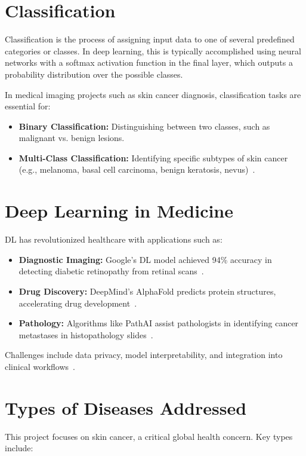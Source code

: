 \documentclass[a4paper,12pt]{report}
\begin{document}
\begin{spacing}{1.5}
    \section{Classification}
    Classification is the process of assigning input data to one of several predefined categories or classes. In deep learning, this is typically accomplished using neural networks with a softmax activation function in the final layer, which outputs a probability distribution over the possible classes.

    In medical imaging projects such as skin cancer diagnosis, classification tasks are essential for:
    \begin{itemize}
        \item \textbf{Binary Classification:} Distinguishing between two classes, such as malignant vs. benign lesions.
        \item \textbf{Multi-Class Classification:} Identifying specific subtypes of skin cancer (e.g., melanoma, basal cell carcinoma, benign keratosis, nevus)~\cite{dl6}.
    \end{itemize}

    \section{Deep Learning in Medicine}
    DL has revolutionized healthcare with applications such as:

    \begin{itemize}
        \item \textbf{Diagnostic Imaging:} Google’s DL model achieved 94\% accuracy in detecting diabetic retinopathy from retinal scans~\cite{dl8}.
        \item \textbf{Drug Discovery:} DeepMind’s AlphaFold predicts protein structures, accelerating drug development~\cite{dl9}.
        \item \textbf{Pathology:} Algorithms like PathAI assist pathologists in identifying cancer metastases in histopathology slides~\cite{dl10}.
    \end{itemize}
    Challenges include data privacy, model interpretability, and integration into clinical workflows~\cite{dl11}.
    
    \newpage
    \section{Types of Diseases Addressed}
    This project focuses on skin cancer, a critical global health concern. Key types include:
    

\end{spacing}
\end{document}

